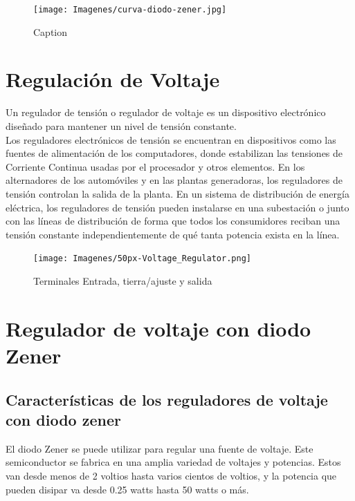 \documentclass{article}
\begin{document}
 \begin{figure}[ht!]
     \centering
     \texttt{[image: Imagenes/curva-diodo-zener.jpg]}
     \caption{Caption}
     \label{fig:curvaZener}
 \end{figure}
 

\section{Regulación de Voltaje}

Un regulador de tensión o regulador de voltaje es un dispositivo electrónico diseñado para mantener un nivel de tensión constante.\citep{regTensWiki}\\

Los reguladores electrónicos de tensión se encuentran en dispositivos como las fuentes de alimentación de los computadores, donde estabilizan las tensiones de Corriente Continua usadas por el procesador y otros elementos. En los alternadores de los automóviles y en las plantas generadoras, los reguladores de tensión controlan la salida de la planta. En un sistema de distribución de energía eléctrica, los reguladores de tensión pueden instalarse en una subestación o junto con las líneas de distribución de forma que todos los consumidores reciban una tensión constante independientemente de qué tanta potencia exista en la línea.\citep{regTensWiki}\\

\begin{figure}[ht!]
    \centering
    \texttt{[image: Imagenes/50px-Voltage\_Regulator.png]}
    \caption{Terminales 	Entrada, tierra/ajuste y salida}
    \label{fig:simb}
\end{figure}

\section{Regulador de voltaje con diodo Zener}

\subsection{Características de los reguladores de voltaje con diodo zener}

El diodo Zener se puede utilizar para regular una fuente de voltaje. Este semiconductor se fabrica en una amplia variedad de voltajes y potencias. Estos van desde menos de 2 voltios hasta varios cientos de voltios, y la potencia que pueden disipar va desde 0.25 watts hasta 50 watts o más.\citep{regZener}\\
\end{document}
